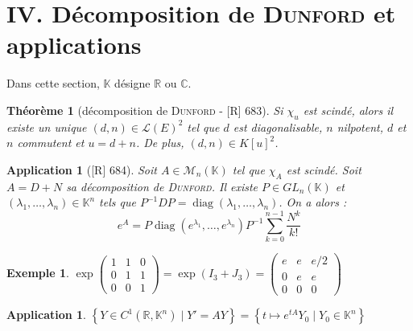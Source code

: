 \documentclass[10pt, a4paper, parskip=full, twoside, twocolumn]{report}
\newtheorem{theorem}[definition]{Théorème}
\newtheorem{example}[definition]{Exemple}
\newtheorem{application}[definition]{Application}
\newcommand{\IK}{\mathbb{K}}
\newcommand{\IC}{\mathbb{C}}
\newcommand{\IR}{\mathbb{R}}
\newcommand{\M}{\mathcal{M}}
\DeclareMathOperator{\diag}{diag}
\begin{document}
\section*{IV. Décomposition de \textsc{Dunford} et applications}
\textcolor{paragraphtext}{Dans cette section, $\IK$ désigne $\IR$ ou $\IC$.}


\begin{tcolorbox}[
    breakable, %
    colback=developpement, %
    colframe=gray!0!black, %
    boxrule=0pt, %
    arc=1mm, %
	boxsep=0pt,
	left=0pt, right=0pt, top=0pt, bottom=0pt
]
\begin{theorem}[décomposition de \textsc{Dunford} - \textnormal{[R] 683}]
	\label{156dev11}
	Si $\chi_u$ est scindé, alors il existe un unique $(d,n)\in\mathcal{L}(E)^2$ tel que $d$ est diagonalisable, $n$ nilpotent, $d$ et $n$ commutent et $u = d + n$.
	De plus, $(d,n)\in K[u]^2$.
\end{theorem}

\begin{application}[\textnormal{[R] 684}]
	\label{156dev12}
	Soit $A\in\M_n(\IK)$ tel que $\chi_A$ est scindé. Soit $A = D+N$ sa
	décomposition de \textsc{Dunford}. Il existe $P\in GL_n(\IK)$ et $(\lambda_1,\dots,\lambda_n)\in\IK^n$ tels que 
	$P^{-1}DP = \diag(\lambda_1,\dots, \lambda_n)$. On a alors :
	$$e^A = P\diag(e^{\lambda_1},\dots, e^{\lambda_n})P^{-1}\sum_{k=0}^{n-1}\frac{N^k}{k!}$$
\end{application}
\end{tcolorbox}

\begin{example}
	$\exp\left(\begin{smallmatrix}
		1&1&0\\0&1&1\\0&0&1
	\end{smallmatrix}\right) = \exp\left(I_3 + J_3\right) = \left(\begin{smallmatrix}
		e&e&e/2 \\ 0&e&e \\ 0&0&0
	\end{smallmatrix}\right)$
\end{example}

\begin{application}
	$\left\{Y\in C^1(\IR,\IK^n)\mid Y' = AY\right\} = \left\{t\mapsto e^{tA}Y_0\mid Y_0\in \IK^n\right\}$
\end{application}
\end{document}
